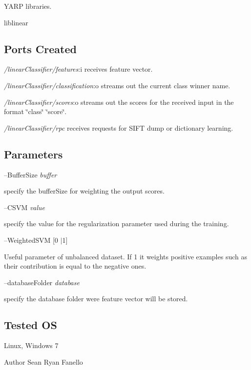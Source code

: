 \begin{DoxyItemize}
\item Y\+A\+R\+P libraries.
\item liblinear
\end{DoxyItemize}\hypertarget{group__icub__sparseCoder_portsc_sec}{}\subsection{Ports Created}\label{group__icub__sparseCoder_portsc_sec}

\begin{DoxyItemize}
\item {\itshape /linear\+Classifier/features}\+:i receives feature vector.
\item {\itshape /linear\+Classifier/classification}\+:o streams out the current class winner name.
\item {\itshape /linear\+Classifier/scores}\+:o streams out the scores for the received input in the format \char`\"{}class\char`\"{} \char`\"{}score\char`\"{}.
\item {\itshape /linear\+Classifier/rpc} receives requests for S\+I\+F\+T dump or dictionary learning.
\end{DoxyItemize}\hypertarget{group__icub__sparseCoder_parameters_sec}{}\subsection{Parameters}\label{group__icub__sparseCoder_parameters_sec}
--Buffer\+Size {\itshape buffer} 
\begin{DoxyItemize}
\item specify the buffer\+Size for weighting the output scores.
\end{DoxyItemize}

--C\+S\+V\+M {\itshape value} 
\begin{DoxyItemize}
\item specify the value for the regularization parameter used during the training.
\end{DoxyItemize}

--Weighted\+S\+V\+M {\itshape }\mbox{[}0 $\vert$1\mbox{]}
\begin{DoxyItemize}
\item Useful parameter of unbalanced dataset. If 1 it weights positive examples such as their contribution is equal to the negative ones.
\end{DoxyItemize}

--database\+Folder {\itshape database} 
\begin{DoxyItemize}
\item specify the database folder were feature vector will be stored.
\end{DoxyItemize}\hypertarget{group__icub__sparseCoder_tested_os_sec}{}\subsection{Tested O\+S}\label{group__icub__sparseCoder_tested_os_sec}
Linux, Windows 7

\begin{DoxyAuthor}{Author}
Sean Ryan Fanello 
\end{DoxyAuthor}
